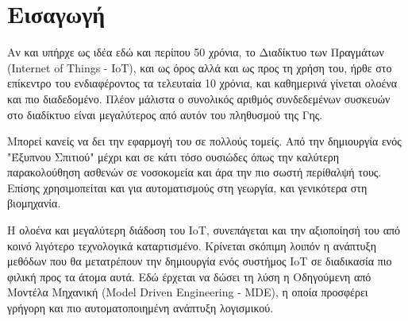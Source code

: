 \chapter{Εισαγωγή}
\label{chapter:intro}

\setlength{\parskip}{1em}

Αν και υπήρχε ως ιδέα εδώ και περίπου 50 χρόνια, το Διαδίκτυο των Πραγμάτων (Internet of Things - IoT), και ως όρος αλλά και ως προς τη χρήση του, ήρθε στο επίκεντρο του ενδιαφέροντος τα τελευταία 10 χρόνια, και καθημερινά γίνεται ολοένα και πιο διαδεδομένο. Πλέον μάλιστα ο συνολικός αριθμός συνδεδεμένων συσκευών στο διαδίκτυο είναι μεγαλύτερος από αυτόν του πληθυσμού της Γης.

Μπορεί κανείς να δει την εφαρμογή του σε πολλούς τομείς. Από την δημιουργία ενός "Έξυπνου Σπιτιού" μέχρι και σε κάτι τόσο ουσιώδες όπως την καλύτερη παρακολούθηση ασθενών σε νοσοκομεία και άρα την πιο σωστή περίθαλψή τους. Επίσης χρησιμοπείται και για αυτοματισμούς στη γεωργία, και γενικότερα στη βιομηχανία.

Η ολοένα και μεγαλύτερη διάδοση του IoT, συνεπάγεται και την αξιοποίησή του από κοινό λιγότερο τεχνολογικά καταρτισμένο. Κρίνεται σκόπιμη λοιπόν η ανάπτυξη μεθόδων που θα μετατρέπουν την δημιουργία ενός συστήμος IoT σε διαδικασία πιο φιλική προς τα άτομα αυτά. Εδώ έρχεται να δώσει τη λύση η Οδηγούμενη από Μοντέλα Μηχανική (Model Driven Engineering - MDE), η οποία προσφέρει γρήγορη και πιο αυτοματοποιημένη ανάπτυξη λογισμικού.




